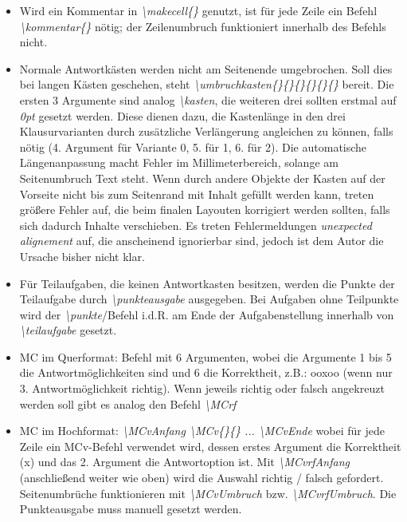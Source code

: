 \documentclass[./main.tex]{subfiles}
\begin{document}
\begin{itemize}
    \item Wird ein Kommentar in \textit{\textbackslash makecell\{\}} genutzt, ist f\"ur jede Zeile ein Befehl \textit{\textbackslash kommentar\{\}} n\"otig; der Zeilenumbruch funktioniert innerhalb des Befehls nicht.
    \item Normale Antwortk\"asten werden nicht am Seitenende umgebrochen. Soll dies bei langen K\"asten geschehen, steht \hypertarget{umbruchkasten}{\textit{\textbackslash umbruchkasten\{\}\{\}\{\}\{\}\{\}\{\}}} bereit. Die ersten 3 Argumente sind analog \textit{\textbackslash kasten}, die weiteren drei sollten erstmal auf \textit{0pt} gesetzt werden. Diese dienen dazu, die Kastenl\"ange in den drei Klausurvarianten durch zus\"atzliche Verl\"angerung angleichen zu k\"onnen, falls n\"otig (4. Argument f\"ur Variante 0, 5. f\"ur 1, 6. f\"ur 2). Die automatische L\"angenanpassung macht Fehler im Millimeterbereich, solange am Seitenumbruch Text steht. Wenn durch andere Objekte der Kasten auf der Vorseite nicht bis zum Seitenrand mit Inhalt gef\"ullt werden kann, treten gr\"o\ss{}ere Fehler auf, die beim finalen Layouten korrigiert werden sollten, falls sich dadurch Inhalte verschieben. Es treten Fehlermeldungen \textit{unexpected alignement} auf, die anscheinend ignorierbar sind, jedoch ist dem Autor die Ursache bisher nicht klar. 
    \item F\"ur Teilaufgaben, die keinen Antwortkasten besitzen, werden die Punkte der Teilaufgabe durch \hypertarget{punkteausgabe}{\textit{\textbackslash punkteausgabe}} ausgegeben. Bei Aufgaben ohne Teilpunkte wird der \textit{\textbackslash punkte}\-/Befehl i.d.R. am Ende der Aufgabenstellung innerhalb von \textit{\textbackslash teilaufgabe} gesetzt.
    \item MC im Querformat: Befehl mit 6 Argumenten, wobei die Argumente 1 bis 5 die Antwortm\"oglichkeiten sind und 6 die Korrektheit, z.B.: ooxoo (wenn nur 3. Antwortm\"oglichkeit richtig). Wenn jeweils richtig oder falsch angekreuzt werden soll gibt es analog den Befehl \hypertarget{MCrf}{\textit{\textbackslash MCrf}}
    \item MC im Hochformat: \textit{\hypertarget{MCvAnfang}{\textbackslash MCvAnfang} \hypertarget{MCv}{\textbackslash MCv\{\}\{\}} ... \hypertarget{MCvEnde}{\textbackslash MCvEnde}} wobei f\"ur jede Zeile ein MCv-Befehl verwendet wird, dessen erstes Argument die Korrektheit (x) und das 2. Argument die Antwortoption ist. Mit \textit{\hypertarget{MCvrfAnfang}{\textbackslash MCvrfAnfang}} (anschlie\ss{}end weiter wie oben) wird die Auswahl richtig / falsch gefordert. Seitenumbr\"uche funktionieren mit \textit{\hypertarget{MCvUmbruch}{\textbackslash MCvUmbruch}} bzw. \textit{\hypertarget{MCvrfUmbruch}{\textbackslash MCvrfUmbruch}}. Die Punkteausgabe muss manuell gesetzt werden.

\end{itemize}
\end{document}
